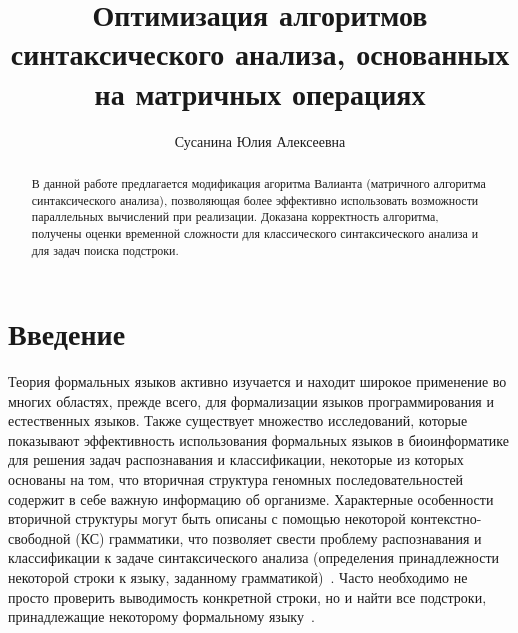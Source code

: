 
\title{Оптимизация алгоритмов синтаксического анализа, основанных на матричных операциях}


\author{Сусанина Юлия Алексеевна}



\maketitle

\begin{abstract}
В данной работе предлагается модификация агоритма Валианта (матричного алгоритма синтаксического анализа), позволяющая более эффективно использовать возможности параллельных вычислений при реализации. Доказана корректность алгоритма, получены оценки временной сложности для классического синтаксического анализа и для задач поиска подстроки.
\end{abstract}

\section*{Введение}

Теория формальных языков активно изучается и находит широкое применение во многих областях, прежде всего, для формализации языков программирования и естественных языков.
Также существует множество исследований, которые показывают эффективность использования формальных языков в биоинформатике  для решения задач распознавания и классификации, некоторые из которых основаны на том, что вторичная структура геномных последовательностей содержит в себе важную информацию об организме.
Характерные особенности вторичной структуры могут быть описаны с помощью некоторой контекстно-свободной (КС) грамматики, что позволяет свести проблему распознавания и классификации к задаче синтаксического анализа (определения принадлежности некоторой строки к языку, заданному грамматикой)~\cite{dowell2004evaluation, knudsen1999rna, rivas2000language}.
Часто необходимо не просто проверить выводимость конкретной строки, но и найти все подстроки, принадлежащие некоторому формальному языку~\cite{durbin1996biological}.

